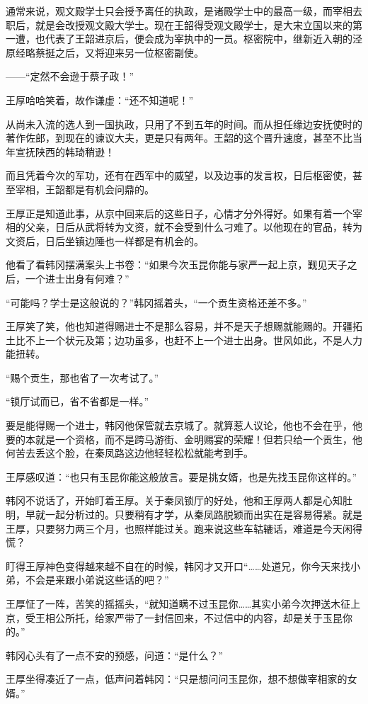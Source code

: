 通常来说，观文殿学士只会授予离任的执政，是诸殿学士中的最高一级，而宰相去职后，就是会改授观文殿大学士。现在王韶得受观文殿学士，是大宋立国以来的第一遭，也代表了王韶进京后，便会成为宰执中的一员。枢密院中，继新近入朝的泾原经略蔡挺之后，又将迎来另一位枢密副使。

——“定然不会逊于蔡子政！”

王厚哈哈笑着，故作谦虚：“还不知道呢！”

从尚未入流的选人到一国执政，只用了不到五年的时间。而从担任缘边安抚使时的著作佐郎，到现在的谏议大夫，更是只有两年。王韶的这个晋升速度，甚至不比当年宣抚陕西的韩琦稍逊！

而且凭着今次的军功，还有在西军中的威望，以及边事的发言权，日后枢密使，甚至宰相，王韶都是有机会问鼎的。

王厚正是知道此事，从京中回来后的这些日子，心情才分外得好。如果有着一个宰相的父亲，日后从武将转为文资，就不会受到什么刁难了。以他现在的官品，转为文资后，日后坐镇边陲也一样都是有机会的。

他看了看韩冈摆满案头上书卷：“如果今次玉昆你能与家严一起上京，觐见天子之后，一个进士出身有何难？”

“可能吗？学士是这般说的？”韩冈摇着头，“一个贡生资格还差不多。”

王厚笑了笑，他也知道得赐进士不是那么容易，并不是天子想赐就能赐的。开疆拓土比不上一个状元及第；边功虽多，也赶不上一个进士出身。世风如此，不是人力能扭转。

“赐个贡生，那也省了一次考试了。”

“锁厅试而已，省不省都是一样。”

要是能得赐一个进士，韩冈他保管就去京城了。就算惹人议论，他也不会在乎，他要的本就是一个资格，而不是跨马游街、金明赐宴的荣耀！但若只给一个贡生，他何苦去丢这个脸，在秦凤路这边他轻轻松松就能考到手。

王厚感叹道：“也只有玉昆你能这般放言。要是挑女婿，也是先找玉昆你这样的。”

韩冈不说话了，开始盯着王厚。关于秦凤锁厅的好处，他和王厚两人都是心知肚明，早就一起分析过的。只要稍有才学，从秦凤路脱颖而出实在是容易得紧。就是王厚，只要努力两三个月，也照样能过关。跑来说这些车轱辘话，难道是今天闲得慌？

盯得王厚神色变得越来越不自在的时候，韩冈才又开口“……处道兄，你今天来找小弟，不会是来跟小弟说这些话的吧？”

王厚怔了一阵，苦笑的摇摇头，“就知道瞒不过玉昆你……其实小弟今次押送木征上京，受王相公所托，给家严带了一封信回来，不过信中的内容，却是关于玉昆你的。”

韩冈心头有了一点不安的预感，问道：“是什么？”

王厚坐得凑近了一点，低声问着韩冈：“只是想问问玉昆你，想不想做宰相家的女婿。”

